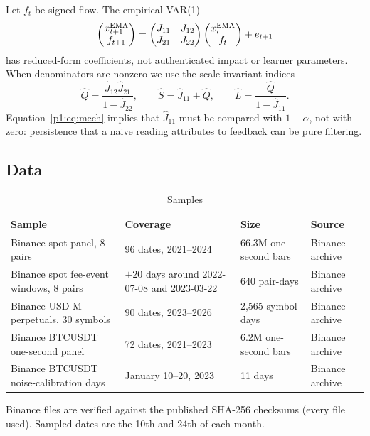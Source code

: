 Let $f_t$ be signed flow. The empirical VAR(1)
\begin{equation}\label{p1:eq:var}
\begin{pmatrix}x^{\rm EMA}_{t+1}\\ f_{t+1}\end{pmatrix}=\begin{pmatrix}J_{11}&J_{12}\\ J_{21}&J_{22}\end{pmatrix}\begin{pmatrix}x^{\rm EMA}_t\\ f_t\end{pmatrix}+e_{t+1}
\end{equation}
has reduced-form coefficients, not authenticated impact or learner parameters. When denominators are nonzero we use the scale-invariant indices
\begin{equation}\label{p1:eq:QS}
\hat Q=\frac{\hat J_{12}\hat J_{21}}{1-\hat J_{22}},\qquad\hat S=\hat J_{11}+\hat Q,\qquad\hat L=\frac{\hat Q}{1-\hat J_{11}} .
\end{equation}
Equation~\eqref{p1:eq:mech} implies that $\hat J_{11}$ must be compared with $1-\alpha$, not with zero: persistence that a naive reading attributes to feedback can be pure filtering.

\subsection{Data}

\begin{table}[t]\centering\small
\begin{threeparttable}
\caption{Samples}\label{p1:tab:samples}
\begin{tabular}{p{}p{}p{}l}
\toprule
Sample & Coverage & Size & Source\\
\midrule
Binance spot panel, 8 pairs & 96 dates, 2021--2024 & 66.3M one-second bars & Binance archive\\
Binance spot fee-event windows, 8 pairs & $\pm20$ days around 2022-07-08 and 2023-03-22 & 640 pair-days & Binance archive\\
Binance USD-M perpetuals, 30 symbols & 90 dates, 2023--2026 & 2{,}565 symbol-days & Binance archive\\
Binance BTCUSDT one-second panel & 72 dates, 2021--2023 & 6.2M one-second bars & Binance archive\\
Binance BTCUSDT noise-calibration days & January 10--20, 2023 & 11 days & Binance archive\\
\bottomrule
\end{tabular}
\begin{tablenotes}\footnotesize\item Binance files are verified against the published SHA-256 checksums (every file used). Sampled dates are the 10th and 24th of each month.\end{tablenotes}
\end{threeparttable}
\end{table}

